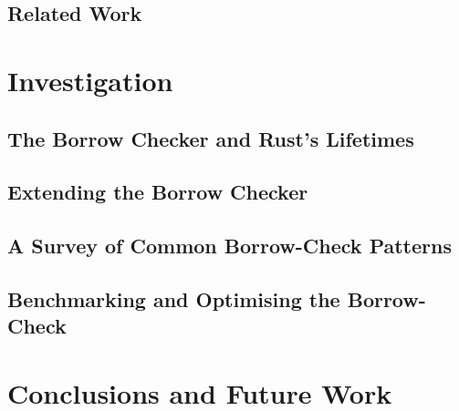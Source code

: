 \documentclass[11pt,a4paper,twoside,openany]{book}
\begin{document}
    \chapter{Related Work}

\part{Investigation}

\chapter{The Borrow Checker and Rust's Lifetimes}

\chapter{Extending the Borrow Checker}

\chapter{A Survey of Common Borrow-Check Patterns}

\chapter{Benchmarking and Optimising the Borrow-Check}

\part{Conclusions and Future Work}


\backmatter
\printbibliography[heading=bibintoc]
\end{document}
